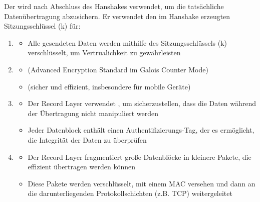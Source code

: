 \begin{infoBox}[title=TLS Record Layer]
    Der  wird nach Abschluss des Hanshakes verwendet, um die tatsächliche Datenübertragung abzusichern. Er verwendet den im Hanshake erzeugten Sitzungsschlüssel (k) für:
    \begin{enumerate}
        \item {}
        \begin{itemize}
            \item Alle gesendeten Daten werden mithilfe des Sitzungsschlüssels (k) verschlüsselt, um Vertrualichkeit zu gewährleisten
        \end{itemize}
        \item {}
        \begin{itemize}
            \item {} (Advanced Encryption Standard im Galois Counter Mode)
            \item {} (sicher und effizient, insbesondere für mobile Geräte)
        \end{itemize}
        \item {}
        \begin{itemize}
            \item Der Record Layer verwendet , um sicherzustellen, dass die Daten während der Übertragung nicht manipuliert werden
            \item Jeder Datenblock enthält einen Authentifizierungs-Tag, der es ermöglicht, die Integrität der Daten zu überprüfen
        \end{itemize}
        \item {}
        \begin{itemize}
            \item Der Record Layer fragmentiert große Datenblöcke in kleinere Pakete, die effizient übertragen werden können
            \item Diese Pakete werden verschlüsselt, mit einem MAC versehen und dann an die darunterliegenden Protokollschichten (z.B. TCP) weitergeleitet
        \end{itemize}
    \end{enumerate}
\end{infoBox}
